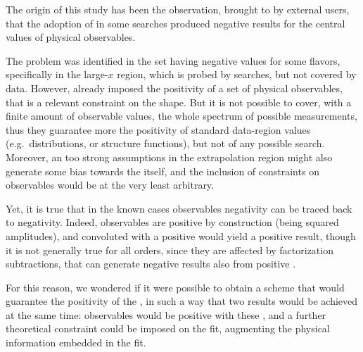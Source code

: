 
The origin of this study has been the observation, brought to \nnpdf by
external users, that the adoption of  in some searches produced
negative results for the central values of physical observables.

The problem was identified in the \pdf set having negative values for some
flavors, specifically in the large-$x$ region, which is probed by searches, but
not covered by data.
%
However, already  imposed the positivity of a set of physical
observables, that is a relevant constraint on the \pdf shape.
But it is not possible to cover, with a finite amount of observable values, the
whole spectrum of possible measurements, thus they guarantee more the
positivity of standard data-region values (e.g.\ \dy distributions, or \dis
structure functions), but not of any possible \bsm search.
%
Moreover, an too strong assumptions in the extrapolation region might also
generate some bias towards the \sm itself, and the inclusion of constraints
on \bsm observables would be at the very least arbitrary.

Yet, it is true that in the known cases observables negativity can be traced
back to \pdfs negativity.
%
Indeed, \lo observables are positive by construction (being squared
amplitudes), and convoluted with a positive \pdf would yield a positive result,
though it is not generally true for all orders, since they are affected by
factorization subtractions, that can generate negative results also from
positive \pdfs.

For this reason, we wondered if it were possible to obtain a scheme that would
guarantee the positivity of the \pdfs, in such a way that two results would be
achieved at the same time: \lo observables would be positive with these \pdfs,
and a further theoretical constraint could be imposed on the fit, augmenting
the physical information embedded in the fit.

